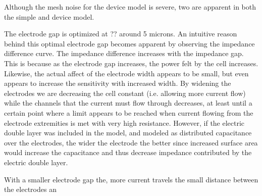 \par Although the mesh noise for the device model is severe, two are apparent in both the simple and device model.

\par The electrode gap is optimized at ?? around 5 microns. An intuitive reason behind this optimal electrode gap becomes apparent by observing the impedance difference curve. The impedance difference increases with the impedance gap. This is because as the electrode gap increases, the power felt by the cell increases. Likewise, the actual affect of the electrode width appears to be small, but even appears to increase the sensitivity with increased width. By widening the electrodes we are decreasing the cell constant (i.e. allowing more current flow) while the channels that the current must flow through decreases, at least until a certain point where a limit appears to be reached when current flowing from the electrode extremities is met with very high resistance. However, if the electric double layer was included in the model, and modeled as distributed capacitance over the electrodes, the wider the electrode the better since increased surface area would increase the capacitance and thus decrease impedance contributed by the electric double layer. 
\par With a smaller electrode gap the, more current travels the small distance between the electrodes an

